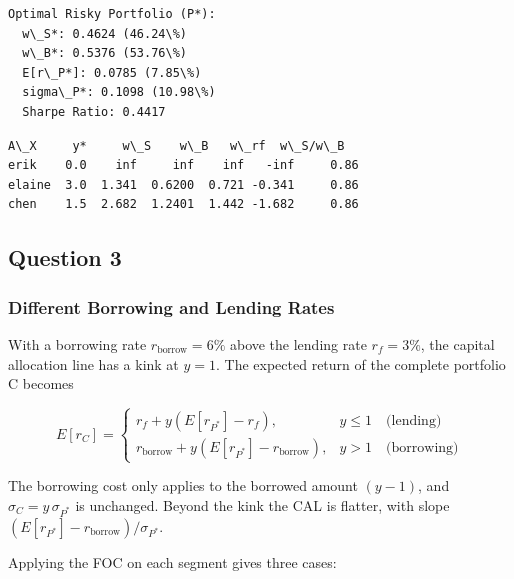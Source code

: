 \documentclass[11pt]{article}
\makeatletter
\newcommand{\boxspacing}{\kern\kvtcb@left@rule\kern\kvtcb@boxsep}
\newcommand{\prompt}[4]{
        {\ttfamily\llap{{\color{#2}[#3]:\hspace{3pt}#4}}\vspace{-\baselineskip}}
    }
\makeatother
\begin{document}
    \begin{Verbatim}[commandchars=\\\{\}]
Optimal Risky Portfolio (P*):
  w\_S*: 0.4624 (46.24\%)
  w\_B*: 0.5376 (53.76\%)
  E[r\_P*]: 0.0785 (7.85\%)
  sigma\_P*: 0.1098 (10.98\%)
  Sharpe Ratio: 0.4417

    \end{Verbatim}

            \begin{tcolorbox}[breakable, size=fbox, boxrule=.5pt, pad at break*=1mm, opacityfill=0]
\prompt{Out}{outcolor}{3}{\boxspacing}
\begin{Verbatim}[commandchars=\\\{\}]
        A\_X     y*     w\_S    w\_B   w\_rf  w\_S/w\_B
erik    0.0    inf     inf    inf   -inf     0.86
elaine  3.0  1.341  0.6200  0.721 -0.341     0.86
chen    1.5  2.682  1.2401  1.442 -1.682     0.86
\end{Verbatim}
\end{tcolorbox}
        
    \subsection{Question 3}\label{question-3}

\subsubsection{Different Borrowing and Lending
Rates}\label{different-borrowing-and-lending-rates}

With a borrowing rate \(r_{\text{borrow}} = 6\%\) above the lending rate
\(r_f = 3\%\), the capital allocation line has a kink at \(y = 1\). The
expected return of the complete portfolio \(\text{C}\) becomes

\[E[r_C] = \begin{cases} r_f + y\left(E[r_{P^*}] - r_f\right), & y \le 1 \quad \text{(lending)} \\ r_{\text{borrow}} + y\left(E[r_{P^*}] - r_{\text{borrow}}\right), & y > 1 \quad \text{(borrowing)} \end{cases}\]

The borrowing cost only applies to the borrowed amount \((y-1)\), and
\(\sigma_C = y\,\sigma_{P^*}\) is unchanged. Beyond the kink the CAL is
flatter, with slope
\(\left(E[r_{P^*}] - r_{\text{borrow}}\right)/\sigma_{P^*}\).

Applying the FOC on each segment gives three cases:
\end{document}
